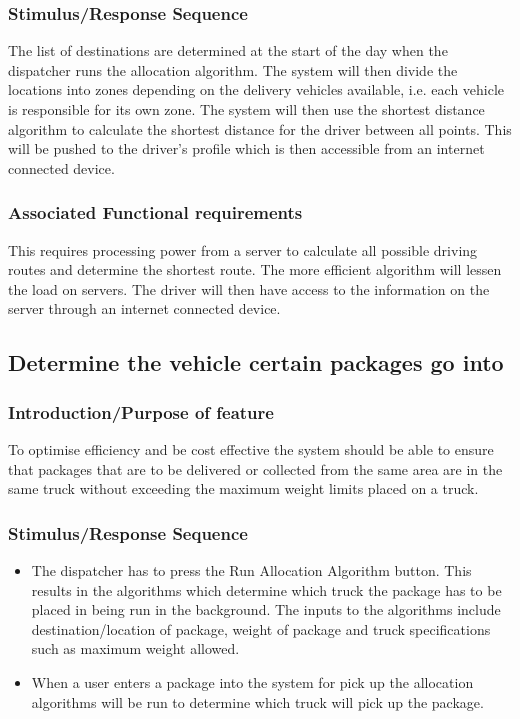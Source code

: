 \documentclass[paper=a4, fontsize=11pt]{scrartcl} %
\numberwithin{equation}{section} %
\numberwithin{figure}{section} %
\numberwithin{table}{section} %
\begin{document}
\subsubsection{Stimulus/Response Sequence}
The list of destinations are determined at the start of the day when the dispatcher runs the allocation algorithm. The system will then divide the locations into zones depending on the delivery vehicles available, i.e. each vehicle is responsible for its own zone. The system will then use the shortest distance algorithm to calculate the shortest distance for the driver between all points. This will be pushed to the driver's profile which is then accessible from an internet connected device.
\subsubsection{Associated Functional requirements}
This requires processing power from a server to calculate all possible driving routes and determine the shortest route. The more efficient algorithm will lessen the load on servers. The driver will then have access to the information on the server through an internet connected device.
\subsection{Determine the vehicle certain packages go into}
\subsubsection{Introduction/Purpose of feature}
To optimise efficiency and be cost effective the system should be able to ensure that packages that are to be delivered or collected from the same area are in the same truck without exceeding the maximum weight limits placed on a truck. 
\subsubsection{Stimulus/Response Sequence}
\begin{itemize}
			\item The dispatcher has to press the Run Allocation Algorithm button. This results in the algorithms which determine which truck the package has to be placed in being run in the background. The inputs to the algorithms include destination/location of package, weight of package and truck specifications such as maximum weight allowed.
			\item When a user enters a package into the system for pick up the allocation algorithms will be run to determine which truck will pick up the package.
\end{itemize}
	 
\end{document}
